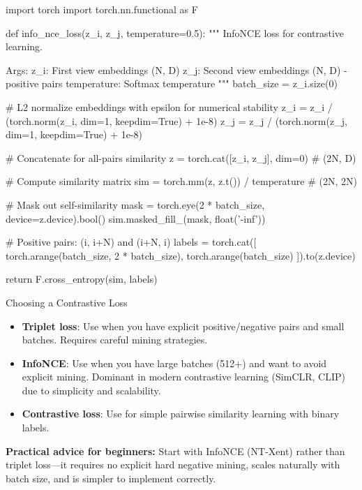 \documentclass[../../main.tex]{subfiles}
\begin{document}
\begin{pythoncode}
import torch
import torch.nn.functional as F

def info_nce_loss(z_i, z_j, temperature=0.5):
    """
    InfoNCE loss for contrastive learning.

    Args:
        z_i: First view embeddings (N, D)
        z_j: Second view embeddings (N, D) - positive pairs
        temperature: Softmax temperature
    """
    batch_size = z_i.size(0)

    # L2 normalize embeddings with epsilon for numerical stability
    z_i = z_i / (torch.norm(z_i, dim=1, keepdim=True) + 1e-8)
    z_j = z_j / (torch.norm(z_j, dim=1, keepdim=True) + 1e-8)

    # Concatenate for all-pairs similarity
    z = torch.cat([z_i, z_j], dim=0)  # (2N, D)

    # Compute similarity matrix
    sim = torch.mm(z, z.t()) / temperature  # (2N, 2N)

    # Mask out self-similarity
    mask = torch.eye(2 * batch_size, device=z.device).bool()
    sim.masked_fill_(mask, float('-inf'))

    # Positive pairs: (i, i+N) and (i+N, i)
    labels = torch.cat([
        torch.arange(batch_size, 2 * batch_size),
        torch.arange(batch_size)
    ]).to(z.device)

    return F.cross_entropy(sim, labels)
\end{pythoncode}

\begin{keyconcept}{Choosing a Contrastive Loss}
\begin{itemize}
\item \textbf{Triplet loss}: Use when you have explicit positive/negative pairs and small batches. Requires careful mining strategies.
\item \textbf{InfoNCE}: Use when you have large batches (512+) and want to avoid explicit mining. Dominant in modern contrastive learning (SimCLR, CLIP) due to simplicity and scalability.
\item \textbf{Contrastive loss}: Use for simple pairwise similarity learning with binary labels.
\end{itemize}

\textbf{Practical advice for beginners:} Start with InfoNCE (NT-Xent) rather than triplet loss---it requires no explicit hard negative mining, scales naturally with batch size, and is simpler to implement correctly.
\end{keyconcept}
\end{document}
